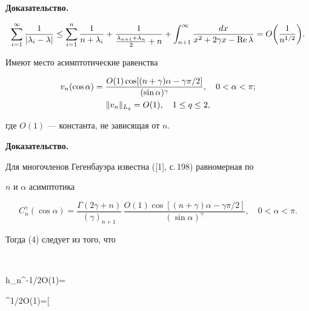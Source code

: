 {\bf Доказательство.}


$$


\sum_{i=1}^\infty \frac1{|\lambda_i-\lambda|}\le


\sum_{i=1}^n\frac1{n+\lambda_i} +


\frac1{\frac{\lambda_{n+1}+\lambda_n}2+n} +


\int_{n+1}^\infty\frac{dx}{x^2+2\gamma x-\re\lambda} =


O\bigg(\frac1{n^{1/2}}\bigg).


$$





\begin{lem} Имеют место асимптотические равенства


\begin{gather}


v_n(\cos\alpha)=\frac{O(1)\cos[(n+\gamma)\alpha-\gamma\pi/2]}


{(\sin\alpha)^\gamma},\quad 0<\alpha<\pi; \\


%


\|v_n\|_{L_q}=O(1), \quad 1\le q\le 2, \notag


\end{gather}


где $O(1)$ --- константа, не зависящая от $n$.


\end{lem}





{\bf Доказательство.}


Для многочленов Гегенбауэра известна ([1], с.\,198) равномерная по


$n$ и $\alpha$ асимптотика


$$


C_n^\gamma(\cos\alpha)=\frac{\Gamma(2\gamma+n)}{(\gamma)_{n+1}}\,


\frac{O(1)\cos[(n+\gamma)\alpha-\gamma\pi/2]}{(\sin\alpha)^\gamma},


\quad 0<\alpha<\pi.


$$


Тогда (4) следует из того, что


$$


h_n^{-1/2}O(1)=


^{1/2}O(1)=\bigg[


